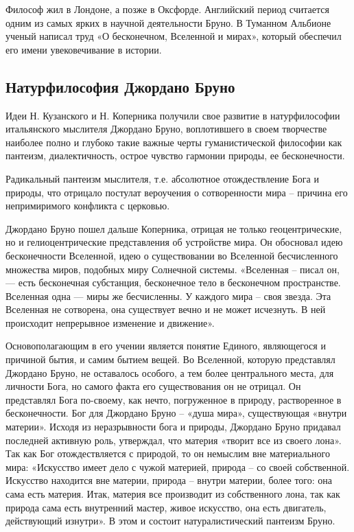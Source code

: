 \documentclass[
]{article}
\begin{document}
Философ жил в Лондоне, а позже в Оксфорде. Английский период считается
одним из самых ярких в научной деятельности Бруно. В Туманном Альбионе
ученый написал труд «О бесконечном, Вселенной и мирах», который
обеспечил его имени увековечивание в истории.

\hypertarget{ux43dux430ux442ux443ux440ux444ux438ux43bux43eux441ux43eux444ux438ux44f-ux434ux436ux43eux440ux434ux430ux43dux43e-ux431ux440ux443ux43dux43e}{%
\subsection{Натурфилософия Джордано
Бруно}\label{ux43dux430ux442ux443ux440ux444ux438ux43bux43eux441ux43eux444ux438ux44f-ux434ux436ux43eux440ux434ux430ux43dux43e-ux431ux440ux443ux43dux43e}}

Идеи Н. Кузанского и Н. Коперника получили свое развитие в
натурфилософии итальянского мыслителя Джордано Бруно, воплотившего в
своем творчестве наиболее полно и глубоко такие важные черты
гуманистической философии как пантеизм, диалектичность, острое чувство
гармонии природы, ее бесконечности.

Радикальный пантеизм мыслителя, т.е. абсолютное отождествление Бога и
природы, что отрицало постулат вероучения о сотворенности мира --
причина его непримиримого конфликта с церковью.

Джордано Бруно пошел дальше Коперника, отрицая не только
геоцентрические, но и гелиоцентрические представления об устройстве
мира. Он обосновал идею бесконечности Вселенной, идею о существовании во
Вселенной бесчисленного множества миров, подобных миру Солнечной
системы. «Вселенная -- писал он, --- есть бесконечная субстанция,
бесконечное тело в бесконечном пространстве. Вселенная одна --- миры же
бесчисленны. У каждого мира -- своя звезда. Эта Вселенная не сотворена,
она существует вечно и не может исчезнуть. В ней происходит непрерывное
изменение и движение».

Основополагающим в его учении является понятие Единого, являющегося и
причиной бытия, и самим бытием вещей. Во Вселенной, которую представлял
Джордано Бруно, не оставалось особого, а тем более центрального места,
для личности Бога, но самого факта его существования он не отрицал. Он
представлял Бога по-своему, как нечто, погруженное в природу,
растворенное в бесконечности. Бог для Джордано Бруно -- «душа мира»,
существующая «внутри материи». Исходя из неразрывности бога и природы,
Джордано Бруно придавал последней активную роль, утверждал, что материя
«творит все из своего лона». Так как Бог отождествляется с природой, то
он немыслим вне материального мира: «Искусство имеет дело с чужой
материей, природа -- со своей собственной. Искусство находится вне
материи, природа -- внутри материи, более того: она сама есть материя.
Итак, материя все производит из собственного лона, так как природа сама
есть внутренний мастер, живое искусство, она есть двигатель, действующий
изнутри». В этом и состоит натуралистический пантеизм Бруно.
\end{document}
